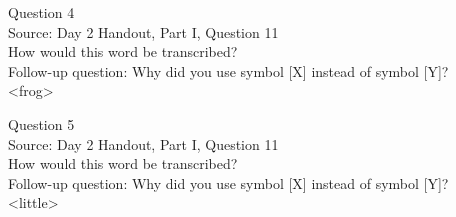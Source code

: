 \documentclass[12pt]{article}
\begin{document}
\newpage

{\large Question 4}\\

Source: Day 2 Handout, Part I, Question 11\\

How would this word be transcribed?\\ Follow-up question: Why did you use symbol [X] instead of symbol [Y]?\\

<frog>


\newpage

{\large Question 5}\\

Source: Day 2 Handout, Part I, Question 11\\

How would this word be transcribed?\\ Follow-up question: Why did you use symbol [X] instead of symbol [Y]?\\

<little>


\newpage

\begin{center}
\textbf{{\color{red}{\HUGE END OF EXAM}}}\\

\end{center}
\newpage
\end{document}
